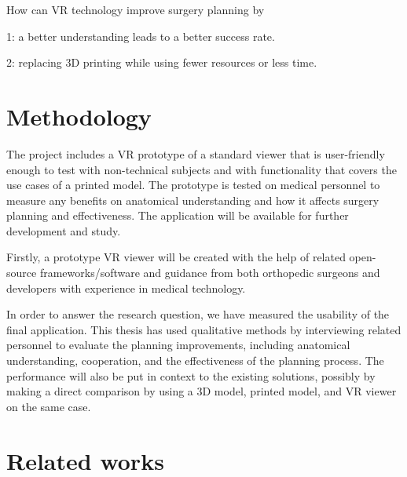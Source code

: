 \documentclass[a4paper]{report}
\begin{document}
How can VR technology improve surgery planning by

1: a better understanding leads to a better success rate.

2: replacing 3D printing while using fewer resources or less time.

\section{Methodology}

The project includes a VR prototype of a standard viewer that is user-friendly enough to test with non-technical subjects and with functionality that covers the use cases of a printed model.
The prototype is tested on medical personnel to measure any benefits on anatomical understanding and how it affects surgery planning and effectiveness. The application will be available for further development and study.

Firstly, a prototype VR viewer will be created with the help of related open-source frameworks/software and guidance from both orthopedic surgeons and developers with experience in medical technology.

In order to answer the research question, we have measured the usability of the final application. This thesis has used qualitative methods
by interviewing related personnel to evaluate the planning improvements, including anatomical understanding, cooperation, and the effectiveness of the planning process.
The performance will also be put in context to the existing solutions, possibly by making a direct comparison by using a 3D model, printed model, and VR viewer
on the same case.

\section{Related works}
\end{document}
